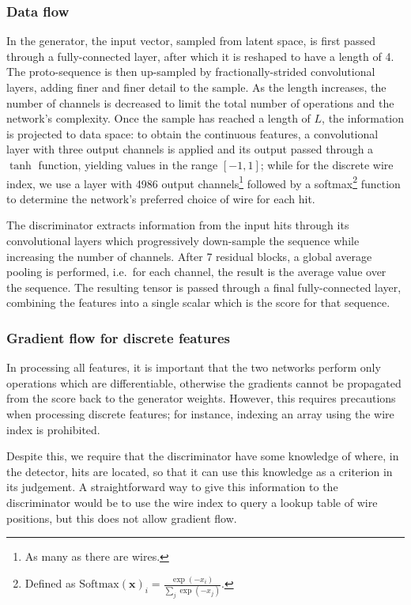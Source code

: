 \subsubsection{Data flow}
In the generator, the input vector, sampled from latent space, is first passed through a fully-connected layer, after which it is reshaped to have a length of 4. The proto-sequence is then up-sampled by fractionally-strided convolutional layers, adding finer and finer detail to the sample. As the length increases, the number of channels is decreased to limit the total number of operations and the network's complexity. Once the sample has reached a length of $L$, the information is projected to data space: to obtain the continuous features, a convolutional layer with three output channels is applied and its output passed through a $\tanh$ function, yielding values in the range $[-1, 1]$; while for the discrete wire index, we use a layer with 4986 output channels\footnote{As many as there are wires.} followed by a softmax\footnote{Defined as $\mathrm{Softmax}(\mathbf{x})_i = \frac{\exp(-x_i)}{\sum_j \exp(-x_j)}.$} function to determine the network's preferred choice of wire for each hit.

The discriminator extracts information from the input hits through its convolutional layers which progressively down-sample the sequence while increasing the number of channels. After 7 residual blocks, a global average pooling is performed, i.e.\ for each channel, the result is the average value over the sequence. The resulting tensor is passed through a final fully-connected layer, combining the features into a single scalar which is the score for that sequence.

\subsubsection{Gradient flow for discrete features}
In processing all features, it is important that the two networks perform only operations which are differentiable, otherwise the gradients cannot be propagated from the score back to the generator weights. However, this requires precautions when processing discrete features; for instance, indexing an array using the wire index is prohibited.

Despite this, we require that the discriminator have some knowledge of where, in the detector, hits are located, so that it can use this knowledge as a criterion in its judgement. A straightforward way to give this information to the discriminator would be to use the wire index to query a lookup table of wire positions, but this does not allow gradient flow. 

